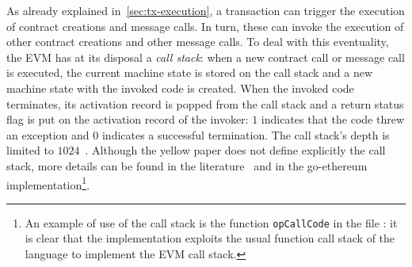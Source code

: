 As already explained in~\autoref{sec:tx-execution}, a transaction can trigger
the execution of contract creations and message calls. In turn, these can invoke
the execution of other contract creations and other message calls. To deal with
this eventuality, the EVM has at its disposal a \emph{call stack}: when a new
contract call or message call is executed, the current machine state is stored
on the call stack and a new machine state with the invoked code is created. When
the invoked code terminates, its activation record is popped from the call stack
and a return status flag is put on the activation record of the invoker: $1$
indicates that the code threw an exception and $0$ indicates a successful
termination. The call stack's depth is limited to
$1024$~\cite{wood2018ethereum}. Although the yellow paper does not define
explicitly the call stack, more details can be found in the
literature~\cite{grishchenko2018semantic} and in the go-ethereum
implementation\footnote{An example of use of the call stack is the function
\texttt{opCallCode} in the file : it is clear that
the implementation exploits the usual function call stack of the language to
implement the EVM call stack.}.
